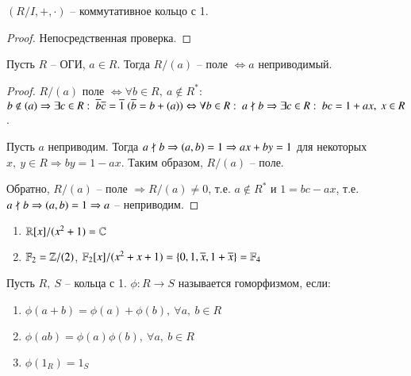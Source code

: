 \documentclass[main]{subfiles}
\begin{document}
\begin{proposition}
    $(R/I, +, \cdot)$ -- коммутативное кольцо с 1.
\end{proposition}

\begin{proof}
    Непосредственная проверка.
\end{proof}

\begin{theorem}
    Пусть $R$ -- ОГИ, $a \in R$. Тогда $R/(a)$ -- поле 
    $\Leftrightarrow a$ неприводимый.
\end{theorem}

\begin{proof}
    $R/(a)$ поле $\Leftrightarrow \forall b \in R, \ a \not\in R^*$: $b \not\in (a) \Rightarrow
    \exists c \in R: \ \overline{b}\overline{c} = \overline{1} \ (\overline{b} = b + (a)) \Leftrightarrow
    \forall b \in R: \ a \not\mid b \Rightarrow \exists c \in R: \ bc = 1 + ax, \ x \in R$. 
    
    Пусть $a$ неприводим. Тогда 
    $a \not\mid b \Rightarrow (a, b) = 1 \Rightarrow ax + by = 1$ для некоторых $x, \ y \in R \Rightarrow by = 1 - ax$.
    Таким образом, $R/(a)$ -- поле. 

    Обратно,  $R/(a)$ -- поле $\Rightarrow R/(a) \neq 0$, т.е. $a \not\in R^*$ и $1 = bc - ax$, т.е. 
    $a \not\mid b \Rightarrow (a, b) = 1 \Rightarrow a$ -- неприводим.
\end{proof}

\begin{example}
    \begin{enumerate}
        \item $\mathbb{R}[x]/(x^2+1) = \mathbb{C}$
        \item $\mathbb{F}_2 = \mathbb{Z}/(2)$, $\mathbb{F}_2[x]/(x^2+x+1) = \{0, 1, \overline{x}, 1 + \overline{x}\}  = \mathbb{F}_4$
    \end{enumerate}
\end{example}

\begin{definition} [Гомоморфизм]
    Пусть $R, \ S$ -- кольца с 1. $\phi: R \rightarrow S$ называется гоморфизмом, если: 
    \begin{enumerate}
        \item $\phi(a+b) = \phi(a) + \phi(b), \ \forall a, \ b \in R$
        \item $\phi(ab) = \phi(a)\phi(b), \ \forall a, \ b \in R$
        \item $\phi(1_R) = 1_S$
    \end{enumerate}
\end{definition}
\end{document}
